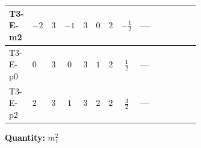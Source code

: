 \documentclass[8pt]{article}
\begin{document}
\begin{landscape}
\begin{longtable}{@{}llcccccc >{\raggedright\arraybackslash}p{0.21\linewidth} >{\raggedright\arraybackslash}p{0.21\linewidth} >{\raggedright\arraybackslash}p{0.21\linewidth}@{}}
\midrule
T3-E-m2 & $-2$ & $3$ & $-1$ & $3$ & $0$ & $2$ & $-\frac{1}{2}$ & --- & \scriptsize\adjustbox{max width=\linewidth}{$\begin{gathered} {m_1^2} (2 T_{\nu}^{(1)}+8 {\lambda_{S_1}^{(1)}}+4 {\lambda_{S_1}^{(A)}})\end{gathered}$} & \scriptsize\adjustbox{max width=\linewidth}{$\begin{gathered} -12 {g_2}^2 {m_1^2}\end{gathered}$} \\
\midrule
T3-E-p0 & $0$ & $3$ & $0$ & $3$ & $1$ & $2$ & $\frac{1}{2}$ & --- & \scriptsize\adjustbox{max width=\linewidth}{$\begin{gathered} {m_1^2} (2 T_{\nu}^{(1)}+8 {\lambda_{S_1}^{(1)}}+4 {\lambda_{S_1}^{(A)}})\end{gathered}$} & \scriptsize\adjustbox{max width=\linewidth}{$\begin{gathered} -12 {g_2}^2 {m_1^2}\end{gathered}$} \\
\midrule
T3-E-p2 & $2$ & $3$ & $1$ & $3$ & $2$ & $2$ & $\frac{3}{2}$ & --- & \scriptsize\adjustbox{max width=\linewidth}{$\begin{gathered} {m_1^2} (2 T_{\nu}^{(1)}+8 {\lambda_{S_1}^{(1)}}+4 {\lambda_{S_1}^{(A)}})\end{gathered}$} & \scriptsize\adjustbox{max width=\linewidth}{$\begin{gathered} -12 {g_2}^2 {m_1^2}\end{gathered}$} \\
\midrule
\bottomrule
\end{longtable}
\clearpage
\noindent\textbf{Quantity: }$m_1^2$\par\smallskip

\end{landscape}
\end{document}
